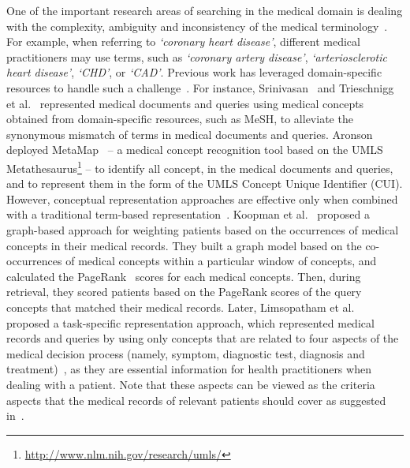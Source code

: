 \documentclass[1p]{elsarticle}
\begin{document}
One of the important research areas of searching in the medical domain is dealing with
the complexity, ambiguity and inconsistency of the medical terminology~\cite{krauthammer2004jbi,limsopatham2011sigir,trieschnigg2010cikm}. For example, when referring to \emph{`coronary heart disease'}, different medical practitioners may use terms, such as \emph{`coronary artery disease'}, \emph{`arteriosclerotic heart disease'}, \emph{`CHD'}, or \emph{`CAD'}. Previous work has leveraged domain-specific resources to handle such a challenge~\cite{krauthammer2004jbi,limsopatham2011sigir,trieschnigg2010cikm}. For instance, Srinivasan~\cite{srinivasan1996ipma} and Trieschnigg et al.~\cite{trieschnigg2010cikm} represented medical documents and queries using medical concepts obtained from domain-specific resources, such as MeSH, to alleviate the synonymous mismatch of terms in medical documents and queries. Aronson~\cite{aronson1994riao} deployed MetaMap~\cite{aronson2010jamia} -- a medical concept recognition tool based on the UMLS Metathesaurus\footnote{\url{http://www.nlm.nih.gov/research/umls/}} -- to identify all concept, in the medical documents and queries, and to represent them in the form of the UMLS Concept Unique Identifier (CUI). 
However, conceptual representation approaches are effective only when combined with a traditional term-based representation~\cite{trieschnigg2010cikm,srinivasan1996ipma}.
Koopman et al.~\cite{koopman2012adcs} proposed a graph-based approach for weighting patients based on the occurrences of medical concepts in their medical records. They built a graph model based on the co-occurrences of medical concepts within a particular window of concepts, and calculated the PageRank~\cite{brin1998} scores for each medical concepts. Then, during retrieval, they scored patients based on the PageRank scores of the query concepts that matched their medical records. Later, Limsopatham et al.~\cite{limsopatham2013oair} proposed a task-specific representation approach, which represented medical records and queries by using only concepts that are related to four aspects of the medical decision process (namely, symptom, diagnostic test, diagnosis and treatment)~\cite{Silfen2006664}, as they are essential information for health practitioners when dealing with a patient. 
Note that these aspects can be viewed as the criteria aspects that the medical records of relevant patients should cover as suggested in~\cite{koopman2014sigir,limsopatham2014cikm}. 
\end{document}
